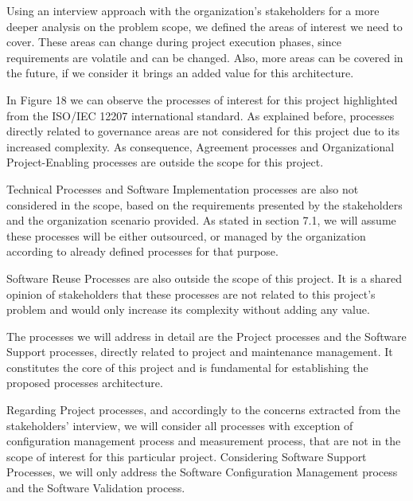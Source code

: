 Using an interview approach with the organization's stakeholders for a more deeper analysis on the problem scope, we defined the areas of interest we need to cover. These areas can change during project execution phases, since requirements are volatile and can be changed. Also, more areas can be covered in the future, if we consider it brings an added value for this architecture.\par
In Figure 18 we can observe the processes of interest for this project highlighted from the ISO/IEC 12207 international standard. As explained before, processes directly related to governance areas are not considered for this project due to its increased complexity. As consequence, Agreement processes and Organizational Project-Enabling processes are outside the scope for this project.\par
Technical Processes and Software Implementation processes are also not considered in the scope, based on the requirements presented by the stakeholders and the organization scenario provided. As stated in section 7.1, we will assume these processes will be either outsourced, or managed by the organization according to already defined processes for that purpose.\par
Software Reuse Processes are also outside the scope of this project. It is a shared opinion of stakeholders that these processes are not related to this project's problem and would only increase its complexity without adding any value.\par
The processes we will address in detail are the Project processes and the Software Support processes, directly related to project and maintenance management. It constitutes the core of this project and is fundamental for establishing the proposed processes architecture.\par
Regarding Project processes, and accordingly to the concerns extracted from the stakeholders' interview, we will consider all processes with exception of configuration management process and measurement process, that are not in the scope of interest for this particular project. Considering Software Support Processes, we will only address the Software Configuration Management process and the Software Validation process.\par


